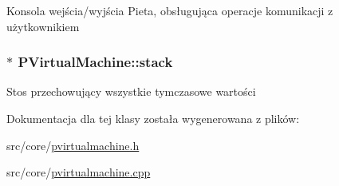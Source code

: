 Konsola wejścia/wyjścia Pieta, obsługująca operacje komunikacji z użytkownikiem \hypertarget{classPVirtualMachine_fe929445de96589087a96a8f1188fac0}{
\subsubsection[{stack}]{$\ast$ {\bf PVirtualMachine::stack}}}
\label{classPVirtualMachine_fe929445de96589087a96a8f1188fac0}


Stos przechowujący wszystkie tymczasowe wartości 

Dokumentacja dla tej klasy została wygenerowana z plików:\begin{CompactItemize}
\item 
src/core/\hyperlink{pvirtualmachine_8h}{pvirtualmachine.h}\item 
src/core/\hyperlink{pvirtualmachine_8cpp}{pvirtualmachine.cpp}\end{CompactItemize}
